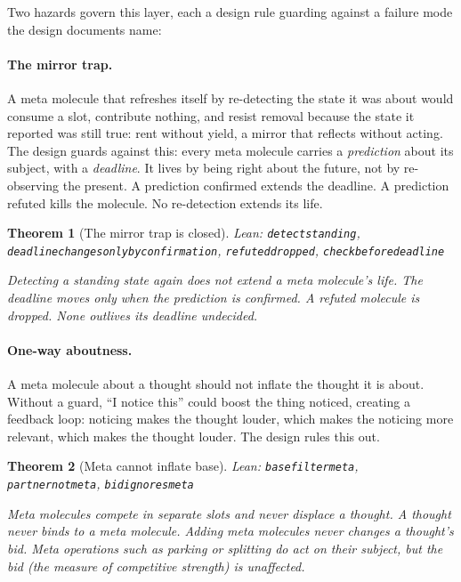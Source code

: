 \documentclass[11pt]{article}
\newcommand{\leanus}{\textunderscore\allowbreak}
\newcommand{\lean}[1]{{\let\_\leanus\texttt{#1}}}
\newtheorem{theorem}{Theorem}[section]
\theoremstyle{remark}
\begin{document}
Two hazards govern this layer, each a design rule guarding against a failure mode the
design documents name:

\paragraph{The mirror trap.} A meta molecule that refreshes itself by re-detecting the
state it was about would consume a slot, contribute nothing, and resist removal because the
state it reported was still true: rent without yield, a mirror that reflects without
acting. The design guards against this: every meta molecule carries a \emph{prediction}
about its subject, with a \emph{deadline}. It lives by being right about the future, not
by re-observing the present. A prediction confirmed extends the deadline. A prediction
refuted kills the molecule. No re-detection extends its life.

\begin{theorem}[The mirror trap is closed]
{\small\sloppy Lean: \lean{detect\_standing},
\lean{deadline\_changes\_only\_by\_confirmation}, \lean{refuted\_dropped},
\lean{check\_before\_deadline}\par}
Detecting a standing state again does not extend a meta molecule's life. The deadline moves
only when the prediction is confirmed. A refuted molecule is dropped. None outlives its
deadline undecided.
\end{theorem}

\paragraph{One-way aboutness.} A meta molecule about a thought should not inflate the
thought it is about. Without a guard, ``I notice this'' could boost the thing noticed,
creating a feedback loop: noticing makes the thought louder, which makes the noticing more
relevant, which makes the thought louder. The design rules this out.

\begin{theorem}[Meta cannot inflate base]
{\small\sloppy Lean: \lean{base\_filter\_meta}, \lean{partner\_not\_meta},
\lean{bid\_ignores\_meta}\par}
Meta molecules compete in separate slots and never displace a thought. A thought never
binds to a meta molecule. Adding meta molecules never changes a thought's bid. Meta
operations such as parking or splitting do act on their subject, but the bid (the
measure of competitive strength) is unaffected.
\end{theorem}
\end{document}
